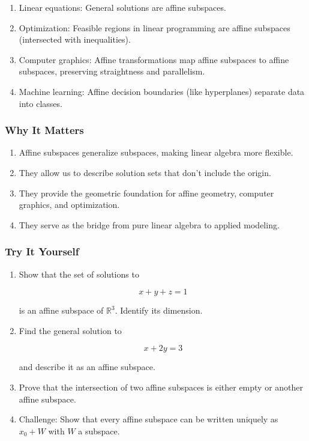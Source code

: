 \documentclass[
  letterpaper,
  DIV=11,
  numbers=noendperiod]{scrreprt}
\providecommand{\tightlist}{%
  \setlength{\itemsep}{0pt}\setlength{\parskip}{0pt}}
\begin{document}
\begin{enumerate}
\def\labelenumi{\arabic{enumi}.}
\tightlist
\item
  Linear equations: General solutions are affine subspaces.
\item
  Optimization: Feasible regions in linear programming are affine
  subspaces (intersected with inequalities).
\item
  Computer graphics: Affine transformations map affine subspaces to
  affine subspaces, preserving straightness and parallelism.
\item
  Machine learning: Affine decision boundaries (like hyperplanes)
  separate data into classes.
\end{enumerate}

\subsubsection{Why It Matters}\label{why-it-matters-36}

\begin{enumerate}
\def\labelenumi{\arabic{enumi}.}
\tightlist
\item
  Affine subspaces generalize subspaces, making linear algebra more
  flexible.
\item
  They allow us to describe solution sets that don't include the origin.
\item
  They provide the geometric foundation for affine geometry, computer
  graphics, and optimization.
\item
  They serve as the bridge from pure linear algebra to applied modeling.
\end{enumerate}

\subsubsection{Try It Yourself}\label{try-it-yourself-39}

\begin{enumerate}
\def\labelenumi{\arabic{enumi}.}
\item
  Show that the set of solutions to

  \[
  x+y+z=1
  \]

  is an affine subspace of \(\mathbb{R}^3\). Identify its dimension.
\item
  Find the general solution to

  \[
  x+2y=3
  \]

  and describe it as an affine subspace.
\item
  Prove that the intersection of two affine subspaces is either empty or
  another affine subspace.
\item
  Challenge: Show that every affine subspace can be written uniquely as
  \(x_0 + W\) with \(W\) a subspace.
\end{enumerate}
\end{document}
